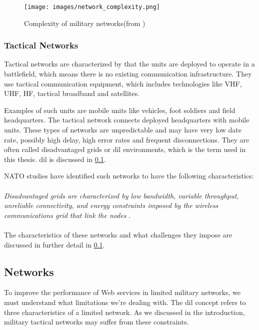 \begin{figure}[h]
\texttt{[image: images/network\_complexity.png]}
\caption{Complexity of military networks(from \cite{pervasive-web})}
\label{figure:military-networks}
\end{figure}

\subsubsection{Tactical Networks}
Tactical networks are characterized by that the units are deployed to operate in
a battlefield, which means there is no existing communication infrastructure.
They use tactical communication equipment, which includes technologies like VHF,
UHF, HF, tactical broadband and satellites\cite{ist-090}.

Examples of such units are mobile units like vehicles, foot soldiers and field
headquarters. The tactical network connects deployed headquarters with mobile
units. These types of networks are unpredictable and may have very low date
rate, possibly high delay, high error rates and frequent disconnections. They
are often called disadvantaged grids or \gls{dil} environments, which is the
term used in this thesis. \gls{dil} is discussed in \cref{dil}.

NATO studies\cite{nato-disadvantaged-grids} have identified such networks to
have the following characteristics:
\\\\
\textit{
Disadvantaged grids are characterized by low bandwidth, variable throughput,
unreliable connectivity, and energy constraints imposed by the wireless
communications grid that link the nodes
}.
\paragraph{}
The characteristics of these networks and what challenges they impose are
discussed in further detail in \cref{dil}.


\subsection{ Networks}
\label{dil}

To improve the performance of Web services in limited military networks, we
must understand what limitations we're dealing with. The \gls{dil} concept refers
to three characteristics of a limited network. As we discussed in the
introduction, military tactical networks may suffer from these constraints.

